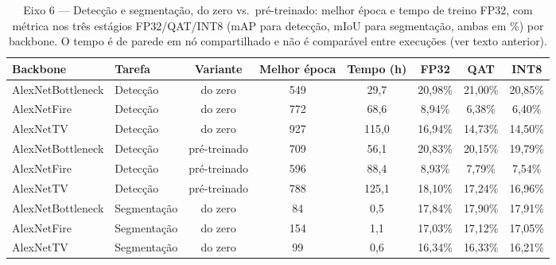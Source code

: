 \documentclass[conference]{IEEEtran}
\begin{document}
\begin{table}[!t]
\caption{Eixo 6 — Detecção e segmentação, do zero vs.\ pré-treinado: melhor época e tempo de treino FP32, com métrica nos três estágios FP32/QAT/INT8 (mAP para detecção, mIoU para segmentação, ambas em \%) por backbone. O tempo é de parede em nó compartilhado e não é comparável entre execuções (ver texto anterior).}
\label{tab:phase7_training}
\centering
\begin{tabular}{@{}llcccccc@{}}
\toprule
\textbf{Backbone} & \textbf{Tarefa} & \textbf{Variante} & \textbf{Melhor época} & \textbf{Tempo (h)} & \textbf{FP32} & \textbf{QAT} & \textbf{INT8} \\
\midrule
AlexNetBottleneck & Detecção & do zero & 549 & 29,7 & 20,98\% & 21,00\% & 20,85\% \\
AlexNetFire & Detecção & do zero & 772 & 68,6 & 8,94\% & 6,38\% & 6,40\% \\
AlexNetTV & Detecção & do zero & 927 & 115,0 & 16,94\% & 14,73\% & 14,50\% \\
AlexNetBottleneck & Detecção & pré-treinado & 709 & 56,1 & 20,83\% & 20,15\% & 19,79\% \\
AlexNetFire & Detecção & pré-treinado & 596 & 88,4 & 8,93\% & 7,79\% & 7,54\% \\
AlexNetTV & Detecção & pré-treinado & 788 & 125,1 & 18,10\% & 17,24\% & 16,96\% \\
AlexNetBottleneck & Segmentação & do zero & 84 & 0,5 & 17,84\% & 17,90\% & 17,91\% \\
AlexNetFire & Segmentação & do zero & 154 & 1,1 & 17,03\% & 17,12\% & 17,05\% \\
AlexNetTV & Segmentação & do zero & 99 & 0,6 & 16,34\% & 16,33\% & 16,21\% \\
\bottomrule
\end{tabular}
\end{table}
\end{document}

